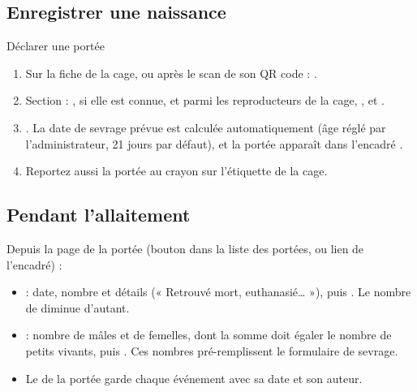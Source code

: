 \documentclass[11pt,a4paper]{article}
\begin{document}
\subsection{Enregistrer une naissance}
\begin{procedure}{Déclarer une portée}
\begin{enumerate}
  \item Sur la fiche de la cage, ou après le scan de son QR code :
    .
  \item Section  : ,
     si elle est connue,  et 
    parmi les reproducteurs de la cage, ,
     et .
  \item {}. La date de sevrage prévue est
    calculée automatiquement (âge réglé par l'administrateur, 21 jours par
    défaut), et la portée apparaît dans l'encadré .
  \item Reportez aussi la portée au crayon sur l'étiquette de la cage.
\end{enumerate}
\end{procedure}

\subsection{Pendant l'allaitement}
Depuis la page de la portée (bouton  dans la liste des portées,
ou lien de l'encadré) :
\begin{itemize}
  \item {} : date, nombre et détails
    (« Retrouvé mort, euthanasié… »), puis . Le
    nombre de  diminue d'autant.
  \item {} : nombre de mâles et de femelles, dont la somme doit
    égaler le nombre de petits vivants, puis .
    Ces nombres pré-remplissent le formulaire de sevrage.
  \item Le  de la portée garde chaque événement avec sa date et
    son auteur.
\end{itemize}
\end{document}
